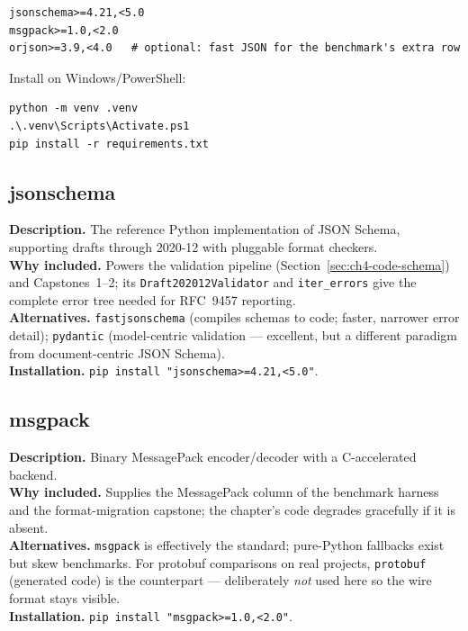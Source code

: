 \begin{verbatim}
jsonschema>=4.21,<5.0
msgpack>=1.0,<2.0
orjson>=3.9,<4.0   # optional: fast JSON for the benchmark's extra row
\end{verbatim}

Install on Windows/PowerShell:

\begin{verbatim}
python -m venv .venv
.\.venv\Scripts\Activate.ps1
pip install -r requirements.txt
\end{verbatim}

\subsection{jsonschema}
\textbf{Description.} The reference Python implementation of JSON Schema,
supporting drafts through 2020-12 with pluggable format checkers.\\
\textbf{Why included.} Powers the validation pipeline
(Section~\ref{sec:ch4-code-schema}) and Capstones~1--2; its
\texttt{Draft202012Validator} and \texttt{iter\_errors} give the complete error
tree needed for RFC~9457 reporting.\\
\textbf{Alternatives.} \texttt{fastjsonschema} (compiles schemas to code; faster,
narrower error detail); \texttt{pydantic} (model-centric validation --- excellent,
but a different paradigm from document-centric JSON Schema).\\
\textbf{Installation.} \texttt{pip install "jsonschema>=4.21,<5.0"}.

\subsection{msgpack}
\textbf{Description.} Binary MessagePack encoder/decoder with a C-accelerated
backend.\\
\textbf{Why included.} Supplies the MessagePack column of the benchmark harness
and the format-migration capstone; the chapter's code degrades gracefully if it is
absent.\\
\textbf{Alternatives.} \texttt{msgpack} is effectively the standard; pure-Python
fallbacks exist but skew benchmarks. For protobuf comparisons on real projects,
\texttt{protobuf} (generated code) is the counterpart --- deliberately
\emph{not} used here so the wire format stays visible.\\
\textbf{Installation.} \texttt{pip install "msgpack>=1.0,<2.0"}.

